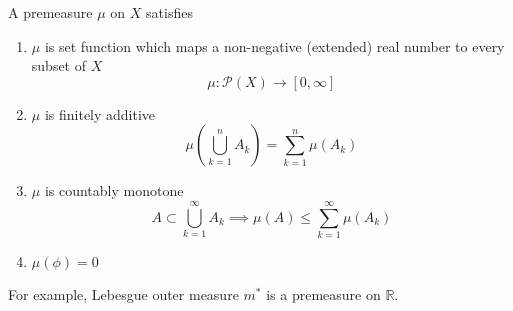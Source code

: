 \begin{commentary}

\begin{definition}[premeasure]
	A premeasure $\mu$ on $X$ satisfies 
	\begin{enumerate}
		\item $\mu$ is set function which maps a non-negative (extended) real number to every subset of $X$
			$$ \mu : \mathcal{P}(X) \to [0,\infty] $$
		\item $\mu$ is finitely additive
			$$ \mu \left( \bigcup_{k=1}^n A_k \right) = \sum_{k=1}^n \mu(A_k) $$
		\item $\mu$ is countably monotone
			$$ A \subset \bigcup_{k=1}^\infty A_k \implies \mu(A) \le \sum_{k=1}^\infty \mu(A_k) $$
		\item $\mu(\phi) = 0$
	\end{enumerate}
\end{definition}
For example, Lebesgue outer measure $m^\ast$ is a premeasure on $\mathbb{R}$.
\end{commentary}

